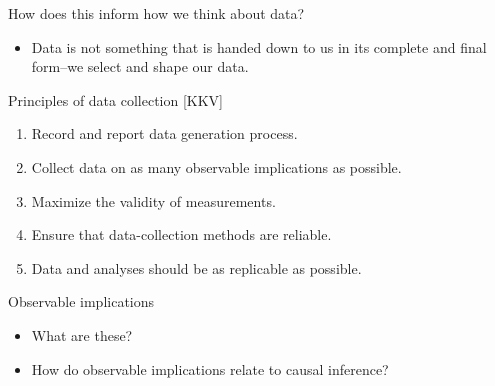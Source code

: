 \documentclass[xcolor={dvipsnames},handout]{beamer}
\begin{document}

\begin{frame}{How does this inform how we think about data?}

\begin{itemize}
\item Data is not something that is handed down to us in its complete and final form--we select and shape our data. 
\end{itemize}

\end{frame}



\begin{frame}{Principles of data collection [KKV]}

\begin{enumerate}
\item Record and report data generation process.
\item Collect data on as many observable implications as possible. 
\item Maximize the validity of measurements. 
\item Ensure that data-collection methods are reliable.
\item Data and analyses should be as replicable as possible. 
\end{enumerate}

\end{frame}


\begin{frame}{Observable implications}

\begin{itemize}
\item What are these?
\item How do observable implications relate to causal inference?
\end{itemize}

\end{frame}
\end{document}
